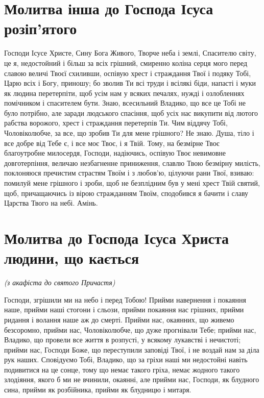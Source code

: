\documentclass[chapters.tex]{subfiles}
\begin{document}
\section{Молитва інша до Господа Ісуса розіп’ятого}
Господи Ісусе Христе, Сину Бога Живого, Творче неба і землі, Спасителю світу, це я, недостойний і більш за всіх грішний, смиренно коліна серця мого перед славою величі Твоєї схиливши, оспівую хрест і страждання Твої і подяку Тобі, Царю всіх і Богу, приношу; бо зволив Ти всі труди і всілякі біди, напасті і муки як людина перетерпіти, щоб усім нам у всяких печалях, нужді і озлобленнях помічником і спасителем бути. Знаю, всесильний Владико, що все це Тобі не було потрібно, але заради людського спасіння, щоб усіх нас викупити від лютого рабства ворожого, хрест і страждання перетерпів Ти. Чим віддячу Тобі, Чоловіколюбче, за все, що зробив Ти для мене грішного? Не знаю. Душа, тіло і все добре від Тебе є, і все моє Твоє, і я Твій. Тому, на безмірне Твоє благоутробне милосердя, Господи, надіючись, оспівую Твоє невимовне довготерпіння, величаю незбагненне приниження, славлю Твою безмірну милість, поклоняюся пречистим страстям Твоїм і з любов’ю, цілуючи рани Твої, взиваю: помилуй мене грішного і зроби, щоб не безплідним був у мені хрест Твій святий, щоб, причащаючись із вірою стражданням Твоїм, сподобився я бачити і славу Царства Твого на небі. Амінь.

\section{Молитва до Господа Ісуса Христа людини, що кається}
\emph{(з акафіста до святого Причастя)}

Господи, згрішили ми на небо і перед Тобою! Прийми навернення і покаяння наше, прийми наші стогони і сльози, прийми покаяння нас грішних, прийми ридання і волання наше аж до смерті. Прийми нас, окаянних, що живемо безсоромно, прийми нас, Чоловіколюбче, що дуже прогнівали Тебе; прийми нас, Владико, що провели все життя в розпусті, у всякому лукавстві і нечистоті; прийми нас, Господи Боже, що переступили заповіді Твої, і не воздай нам за діла рук наших. Сповідуємо Тобі, Владико, що за гріхи наші ми недостойні навіть подивитися на це сонце, тому що немає такого гріха, немає жодного такого злодіяння, якого б ми не вчинили, окаянні, але прийми нас, Господи, як блудного сина, прийми як розбійника, прийми як блудницю і митаря.
\end{document}
